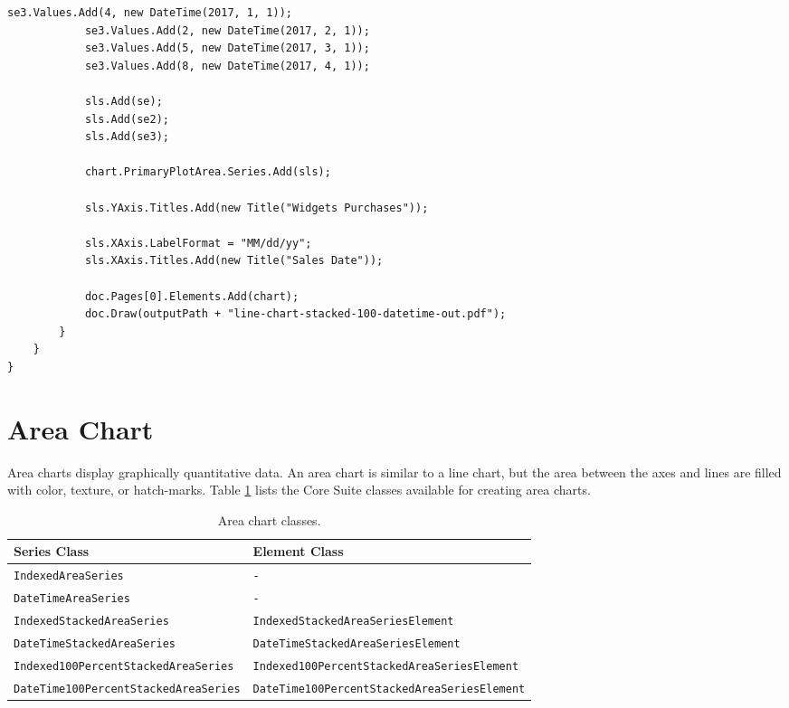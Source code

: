 \documentclass[american]{tufte-book}
\providecommand{\tabularnewline}{\\}
\numberwithin{equation}{section}
\numberwithin{figure}{section}
\begin{document}
{\begin{lstlisting}[caption={Stacked 100\% date/time line chart.},label={lis:dt-Stacked-100=000025-date/time},basicstyle={\footnotesize\ttfamily},breaklines=true]
            se3.Values.Add(4, new DateTime(2017, 1, 1));
            se3.Values.Add(2, new DateTime(2017, 2, 1));
            se3.Values.Add(5, new DateTime(2017, 3, 1));
            se3.Values.Add(8, new DateTime(2017, 4, 1));

            sls.Add(se);
            sls.Add(se2);
            sls.Add(se3);

            chart.PrimaryPlotArea.Series.Add(sls);

            sls.YAxis.Titles.Add(new Title("Widgets Purchases"));

            sls.XAxis.LabelFormat = "MM/dd/yy";
            sls.XAxis.Titles.Add(new Title("Sales Date"));

            doc.Pages[0].Elements.Add(chart);
            doc.Draw(outputPath + "line-chart-stacked-100-datetime-out.pdf");
        }
    }
}
\end{lstlisting}
\leavevmode\egroup


\section{Area Chart}\label{sec:Area-Chart}

Area charts display graphically quantitative data. An area chart is
similar to a line chart, but the area between the axes and lines are
filled with color, texture, or hatch-marks. Table \ref{tab:area-chart-Core-Suite-classes-1-1-1}
lists the Core Suite classes available for creating area charts.

\begin{table}
\raggedright
\begin{tabular}{p{}p{}}
\toprule 
{\scriptsize Series Class} & {\scriptsize Element Class}\tabularnewline
\midrule
{\scriptsize\texttt{IndexedAreaSeries}} & {\scriptsize\texttt{-}}\tabularnewline
{\scriptsize\texttt{DateTimeAreaSeries}} & {\scriptsize\texttt{-}}\tabularnewline
{\scriptsize\texttt{IndexedStackedAreaSeries}} & {\scriptsize\texttt{IndexedStackedAreaSeriesElement}}\tabularnewline
{\scriptsize\texttt{DateTimeStackedAreaSeries}} & {\scriptsize\texttt{DateTimeStackedAreaSeriesElement}}\tabularnewline
{\scriptsize\texttt{Indexed100PercentStackedAreaSeries}} & {\scriptsize\texttt{Indexed100PercentStackedAreaSeriesElement}}\tabularnewline
{\scriptsize\texttt{DateTime100PercentStackedAreaSeries}} & {\scriptsize\texttt{DateTime100PercentStackedAreaSeriesElement}}\tabularnewline
\bottomrule
\end{tabular}\caption{Area chart classes.}\label{tab:area-chart-Core-Suite-classes-1-1-1}
\end{table}

}
\end{document}
